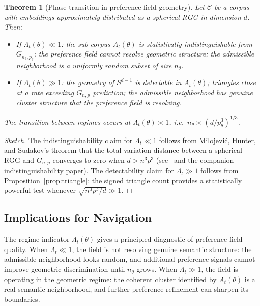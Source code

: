 \documentclass[12pt, a4paper]{article}
\theoremstyle{plain}
\newtheorem{theorem}{Theorem}[section]
\theoremstyle{definition}
\begin{document}
\begin{theorem}[Phase transition in preference field geometry]
\label{thm:transition}
Let $\mathcal{C}$ be a corpus with embeddings approximately distributed as a
spherical RGG in dimension $d$. Then:
\begin{itemize}
  \item If $\Lambda_t(\theta) \ll 1$: the sub-corpus $A_t(\theta)$ is
    statistically indistinguishable from $G_{n_\theta, p_\theta}$; the
    preference field cannot resolve geometric structure; the admissible
    neighborhood is a uniformly random subset of size $n_\theta$.
  \item If $\Lambda_t(\theta) \gg 1$: the geometry of $S^{d-1}$ is
    detectable in $A_t(\theta)$; triangles close at a rate exceeding
    $G_{n,p}$ prediction; the admissible neighborhood has genuine
    cluster structure that the preference field is resolving.
\end{itemize}
The transition between regimes occurs at $\Lambda_t(\theta) \asymp 1$,
i.e.\ $n_\theta \asymp (d/p_\theta^3)^{1/3}$.
\end{theorem}

\begin{proof}[Sketch]
The indistinguishability claim for $\Lambda_t \ll 1$ follows from
Milojević, Hunter, and Sudakov's theorem that the total variation distance
between a spherical RGG and $G_{n,p}$ converges to zero when $d > n^3 p^3$
(see~\cite{hunter2026gaussian} and the companion
indistinguishability paper). The detectability claim for $\Lambda_t \gg 1$
follows from Proposition~\ref{prop:triangle}: the signed triangle count
provides a statistically powerful test whenever $\sqrt{n^3 p^3 / d} \gg 1$.
\end{proof}

\subsection{Implications for Navigation}

The regime indicator $\Lambda_t(\theta)$ gives a principled diagnostic of
preference field quality. When $\Lambda_t \ll 1$, the field is not resolving
genuine semantic structure: the admissible neighborhood looks random, and
additional preference signals cannot improve geometric discrimination until
$n_\theta$ grows. When $\Lambda_t \gg 1$, the field is operating in the
geometric regime: the coherent cluster identified by $A_t(\theta)$ is a real
semantic neighborhood, and further preference refinement can sharpen its
boundaries.
\end{document}

